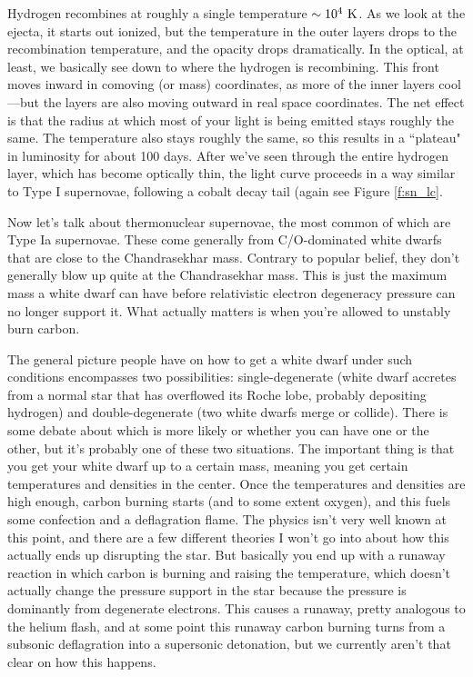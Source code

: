 Hydrogen recombines at roughly a single temperature $\sim 10^4~{\rm K}$. As we look at the ejecta, it starts out ionized, but the temperature in the outer layers drops to the recombination temperature, and the opacity drops dramatically. In the optical, at least, we basically see down to where the hydrogen is recombining. This front moves inward in comoving (or mass) coordinates, as more of the inner layers cool---but the layers are also moving outward in real space coordinates. The net effect is that the radius at which most of your light is being emitted stays roughly the same. The temperature also stays roughly the same, so this results in a ``plateau" in luminosity for about 100 days. After we've seen through the entire hydrogen layer, which has become optically thin, the light curve proceeds in a way similar to Type I supernovae, following a cobalt decay tail (again see Figure \ref{f:sn_lc}.

Now let's talk about thermonuclear supernovae, the most common of which are Type Ia supernovae. These come generally from C/O-dominated white dwarfs that are close to the Chandrasekhar mass. Contrary to popular belief, they don't generally blow up quite at the Chandrasekhar mass. This is just the maximum mass a white dwarf can have before relativistic electron degeneracy pressure can no longer support it. What actually matters is when you're allowed to unstably burn carbon. 

The general picture people have on how to get a white dwarf under such conditions encompasses two possibilities: single-degenerate (white dwarf accretes from a normal star that has overflowed its Roche lobe, probably depositing hydrogen) and double-degenerate (two white dwarfs merge or collide). There is some debate about which is more likely or whether you can have one or the other, but it's probably one of these two situations. The important thing is that you get your white dwarf up to a certain mass, meaning you get certain temperatures and densities in the center. Once the temperatures and densities are high enough, carbon burning starts (and to some extent oxygen), and this fuels some confection and a deflagration flame. The physics isn't very well known at this point, and there are a few different theories I won't go into about how this actually ends up disrupting the star. But basically you end up with a runaway reaction in which carbon is burning and raising the temperature, which doesn't actually change the pressure support in the star because the pressure is dominantly from degenerate electrons. This causes a runaway, pretty analogous to the helium flash, and at some point this runaway carbon burning turns from a subsonic deflagration into a supersonic detonation, but we currently aren't that clear on how this happens.

